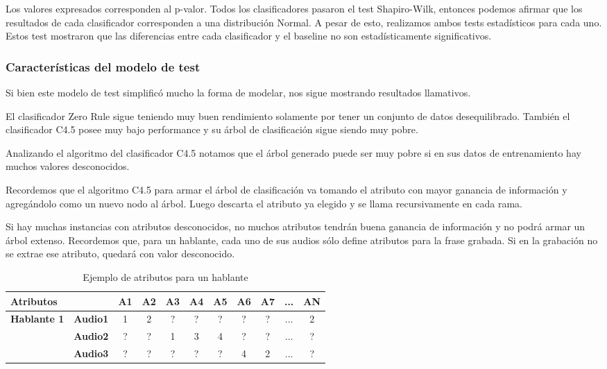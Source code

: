  Los valores expresados corresponden al p-valor. Todos los clasificadores pasaron el test Shapiro-Wilk, entonces podemos afirmar que los resultados de cada clasificador corresponden a una distribución Normal. A pesar de esto, realizamos ambos tests estadísticos para cada uno. Estos test mostraron que las diferencias entre cada clasificador y el baseline no son estadísticamente significativos.


\subsubsection{Características del modelo de test}

Si bien este modelo de test simplificó mucho la forma de modelar, nos sigue mostrando resultados llamativos. 

El clasificador Zero Rule sigue teniendo muy buen rendimiento solamente por tener un conjunto de datos desequilibrado. También el clasificador C4.5 posee muy bajo performance y su árbol de clasificación sigue siendo muy pobre.  

Analizando el algoritmo del clasificador C4.5 notamos que el árbol generado puede ser muy pobre si en sus datos de entrenamiento hay muchos valores desconocidos. 

Recordemos que el algoritmo C4.5 para armar el árbol de clasificación va tomando el atributo con mayor ganancia de información y agregándolo como un nuevo nodo al árbol. Luego descarta el atributo ya elegido y se llama recursivamente en cada rama. 

Si hay muchas instancias con atributos desconocidos, no muchos atributos tendrán buena ganancia de información y no podrá armar un árbol extenso. Recordemos que, para un hablante, cada uno de sus audios sólo define atributos para la frase grabada. Si en la grabación no se extrae ese atributo, quedará con valor desconocido. 

\begin{table}[H]
	\centering
	\begin{tabular}{|l|l|ccccccccc|}
		\hline
		\multicolumn{2}{|l|}{Atributos} & A1 & A2 & A3 & A4 & A5 & A6 & A7 & ... & AN \\
		\hline 
		\textbf{Hablante 1} & \textbf{Audio1} & 1 & 2 & ? & ? & ? & ? & ? & ... & 2 \\
		& \textbf{Audio2} & ? & ? & 1 & 3 & 4 & ? & ? & ... & ? \\
		& \textbf{Audio3} & ? & ? & ? & ? & ? & 4 & 2 &  ... & ? \\
		\hline
	\end{tabular}
	\caption{Ejemplo de atributos para un hablante}
	\label{hablante_ej}
\end{table}


